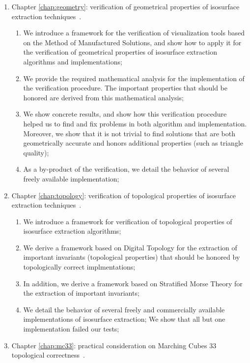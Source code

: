 \begin{enumerate}
\item Chapter \ref{chap:geometry}: verification of geometrical properties of isosurface extraction techniques~\cite{etiene:tvcg:2009}.
\begin{enumerate}
\item We introduce a framework for the verification of visualization tools based on the Method of Manufactured Solutions, and show how to apply it for the verification of geometrical properties of isosurface extraction algorithms and implementations;
\item We provide the required mathematical analysis for the implementation of the verification procedure. The important properties that should be honored are derived from this mathematical analysis;
\item We show concrete results, and show how this verification procedure helped us to find and fix problems in both algorithm and implementation. Moreover, we show that it is not trivial to find solutions that are both geometrically accurate and honors additional properties (such as triangle quality);
\item As a by-product of the verification, we detail the behavior of several freely available implementation;
\end{enumerate}
\item Chapter \ref{chap:topology}: verification of topological properties of isosurface extraction techniques~\cite{Etiene:2012:TVI:2197070.2197097}.
\begin{enumerate}
\item We introduce a framework for verification of topological properties of isosurface extraction algorithms;
\item We derive a framework based on Digital Topology for the extraction of important invariants (topological properties) that should be honored by topologically correct implmentations;
\item In addition, we derive a framework based on Stratified Morse Theory for the extraction of important invariants;
\item We detail the behavior of several freely and commercially available implementations of isosurface extraction; We show that all but one implementation failed our tests;
\end{enumerate}
\item Chapter \ref{chap:mc33}: practical consideration on Marching Cubes 33 topological correctness~\cite{Lis2013}.
\begin{enumerate}

\end{enumerate}
\end{enumerate}
